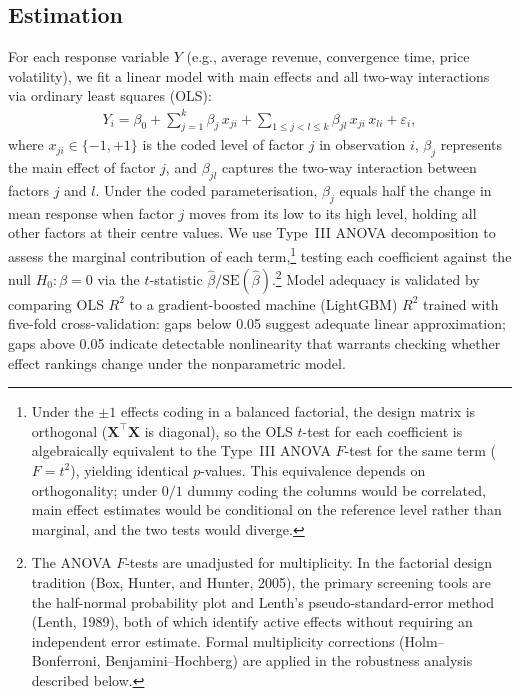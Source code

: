\subsection{Estimation}

For each response variable $Y$ (e.g., average revenue, convergence time, price volatility), we fit a linear model with main effects and all two-way interactions via ordinary least squares (OLS):
\begin{align}
  Y_i = \beta_0 + \sum_{j=1}^{k} \beta_j\, x_{ji} + \sum_{1 \le j < l \le k} \beta_{jl}\, x_{ji}\, x_{li} + \varepsilon_i,
  \label{eq:ols}
\end{align}
where $x_{ji} \in \{-1, +1\}$ is the coded level of factor $j$ in observation $i$, $\beta_j$ represents the main effect of factor $j$, and $\beta_{jl}$ captures the two-way interaction between factors $j$ and $l$. Under the coded parameterisation, $\beta_j$ equals half the change in mean response when factor $j$ moves from its low to its high level, holding all other factors at their centre values. We use Type~III ANOVA decomposition to assess the marginal contribution of each term,\footnote{Under the $\pm 1$ effects coding in a balanced factorial, the design matrix is orthogonal ($\mathbf{X}^\top\mathbf{X}$ is diagonal), so the OLS $t$-test for each coefficient is algebraically equivalent to the Type~III ANOVA $F$-test for the same term ($F = t^2$), yielding identical $p$-values. This equivalence depends on orthogonality; under $0/1$ dummy coding the columns would be correlated, main effect estimates would be conditional on the reference level rather than marginal, and the two tests would diverge.} testing each coefficient against the null $H_0\!: \beta = 0$ via the $t$-statistic $\hat{\beta}/\text{SE}(\hat{\beta})$.\footnote{The ANOVA $F$-tests are unadjusted for multiplicity. In the factorial design tradition (Box, Hunter, and Hunter, 2005), the primary screening tools are the half-normal probability plot and Lenth's pseudo-standard-error method (Lenth, 1989), both of which identify active effects without requiring an independent error estimate. Formal multiplicity corrections (Holm--Bonferroni, Benjamini--Hochberg) are applied in the robustness analysis described below.} Model adequacy is validated by comparing OLS $R^2$ to a gradient-boosted machine (LightGBM) $R^2$ trained with five-fold cross-validation: gaps below 0.05 suggest adequate linear approximation; gaps above 0.05 indicate detectable nonlinearity that warrants checking whether effect rankings change under the nonparametric model.

